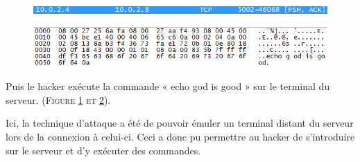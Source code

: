 \documentclass[11pt]{article}
\begin{document}
\begin{figure}[h!]
        \centering \includegraphics[scale=0.9]{Exo3/19.png}
        \caption{}
         \label{fig:19}
\end{figure}

\begin{figure}[h!]
        \centering \includegraphics[scale=0.9]{Exo3/20.png}
        \caption{}
         \label{fig:20}
\end{figure}

Puis le hacker exécute la commande « echo god is good » sur le terminal du serveur. (\textsc{Figure \ref{fig:19} et \ref{fig:20}}).

Ici, la technique d’attaque a été de pouvoir émuler un terminal distant du serveur lors de la connexion à celui-ci. Ceci a donc pu permettre au hacker de s’introduire sur le serveur et d’y exécuter des commandes.


\newpage
\end{document}
